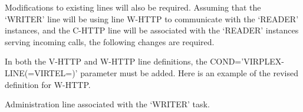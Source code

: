 \documentclass[letterpaper,10pt,english]{sphinxmanual}
\begin{document}
Modifications to existing lines will also be required. Assuming that the ‘WRITER’ line will be using line W-HTTP to communicate with the ‘READER’ instances, and the C-HTTP line will be associated with the ‘READER’ instances serving incoming calls, the following changes are required.


In both the V-HTTP and W-HTTP line definitions, the COND=’VIRPLEX-LINE(=VIRTEL=)’ parameter must be added. Here is an example of the revised definition for W-HTTP.

Administration line associated with the ‘WRITER’ task.

\begin{sphinxVerbatim}[commandchars=\\\{\}]
    
                                                  
                                                  
                                                 
                        
                                                    
                                                 
                                                      
                                                        
                                  
                                               
                                                   
                                                       
                                                     
                                                     
\end{sphinxVerbatim}
\end{document}

